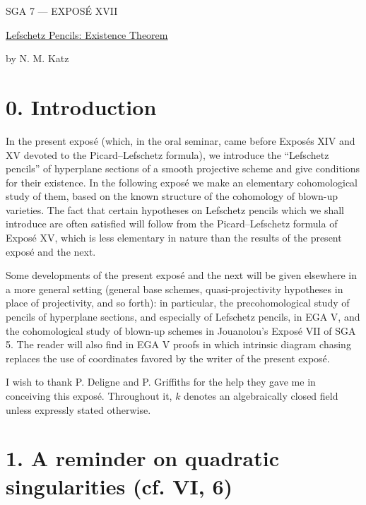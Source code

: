 \clearpage
\begin{center}
{\large SGA 7 --- EXPOS\'E XVII}\par
\vspace{2em}
{\Large\underline{\underline{Lefschetz Pencils: Existence Theorem}}}\par
\vspace{1.5em}
{\large by N. M. Katz}
\end{center}

\section*{0. Introduction}

In the present expos\'e (which, in the oral seminar, came before
Expos\'es XIV and XV devoted to the Picard--Lefschetz formula), we
introduce the ``Lefschetz pencils'' of hyperplane sections of a smooth
projective scheme and give conditions for their existence.  In the
following expos\'e we make an elementary cohomological study of them,
based on the known structure of the cohomology of blown-up varieties.
The fact that certain hypotheses on Lefschetz pencils which we shall
introduce are often satisfied will follow from the Picard--Lefschetz
formula of Expos\'e XV, which is less elementary in nature than the
results of the present expos\'e and the next.

Some developments of the present expos\'e and the next will be given
elsewhere in a more general setting (general base schemes,
quasi-projectivity hypotheses in place of projectivity, and so forth):
in particular, the precohomological study of pencils of hyperplane
sections, and especially of Lefschetz pencils, in EGA V, and the
cohomological study of blown-up schemes in Jouanolou's Expos\'e VII of
SGA 5.  The reader will also find in EGA V proofs in which intrinsic
diagram chasing replaces the use of coordinates favored by the writer
of the present expos\'e.

I wish to thank P. Deligne and P. Griffiths for the help they gave me
in conceiving this expos\'e.  Throughout it, $k$ denotes an
algebraically closed field unless expressly stated otherwise.

\section*{1. A reminder on quadratic singularities (cf. VI, 6)}

